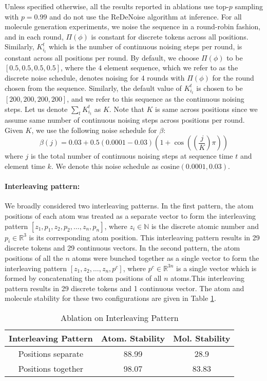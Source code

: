 Unless specified otherwise, all the results reported in ablations use top-$p$ sampling with $p = 0.99$ and do not use the ReDeNoise algorithm at inference. For all molecule generation experiments, we noise the sequence in a round-robin fashion, and in each round, $\Pi(\phi)$ is constant for discrete tokens across all positions. Similarly, $K_{i_t}^{t}$ which is the number of continuous noising steps per round, is constant across all positions per round. By default, we choose $\Pi(\phi)$ to be $[0.5, 0.5, 0.5, 0.5]$, where the $4$ element sequence, which we refer to as the discrete noise schedule, denotes noising for 4 rounds with $\Pi(\phi)$ for the round chosen from the sequence. Similarly, the default value of $K_{i_t}^{t}$ is chosen to be $[200, 200, 200, 200]$, and we refer to this sequence as the continuous noising steps. Let us denote $\sum_{t}K_{i_t}^{t} $ as $K$. Note that $K$ is same across positions since we assume same number of continuous noising steps across positions per round. Given $K$, we use the following noise schedule for $\beta$:
$$ \beta(j) = 0.03 + 0.5(0.0001 - 0.03)(1 + \cos(\left(\frac{j}{K} \right)\pi)) $$
where $j$ is the total number of continuous noising steps at sequence time $t$ and element time $k$. We denote this noise schedule as $\text{cosine}(0.0001, 0.03)$.

\paragraph{Interleaving pattern:}
We broadly considered two interleaving patterns. In the first pattern, the atom positions of each atom was treated as a separate vector to form the interleaving pattern $[z_1, p_1, z_2, p_2, \dots, z_n, p_n ]$, where $z_i \in \mathbb{N}$ is the discrete atomic number and $p_i \in \mathbb{R}^{3}$ is its corresponding atom position. This interleaving pattern results in 29 discrete tokens and 29 continuous vectors. In the second pattern, the atom positions of all the $n$ atoms were bunched together as a single vector to form the interleaving pattern $[z_1, z_2, \dots, z_n, p^c ]$, where $p^c \in \mathbb{R}^{3n}$ is a single vector which is formed by concatenating the atom positions of all $n$ atoms.This interleaving pattern results in 29 discrete tokens and 1 continuous vector. The atom and molecule stability for these two configurations are given in Table \ref{tab:abl_qm9_interleaving}.
\begin{table}[h]
    \centering
    \begin{tabular}{c c c}
    \toprule
   Interleaving Pattern & Atom. Stability & Mol. Stability \\
   \midrule
   Positions separate  &  88.99 & 28.9 \\
   Positions together  & 98.07 & 83.83 \\
   \bottomrule
\end{tabular}
    \caption{Ablation on Interleaving Pattern}
    \label{tab:abl_qm9_interleaving}
\end{table}

